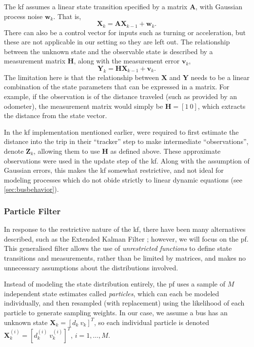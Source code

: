 \documentclass[12pt,a4paper]{article}
\newcommand{\bY}{\mathbf{Y}}
\newcommand{\bX}{\mathbf{X}}
\newcommand{\bZ}{\mathbf{Z}}
\newcommand{\mat}[1]{\mathbf{#1}}
\begin{document}
The \gls{kf} assumes a linear state transition specified by
a matrix $\mat{A}$, with Gaussian process noise $\mat{w}_k$.
That is, 
\begin{equation}
  \label{eq:kf_statetransition}
  \bX_k = \mat{A}\bX_{k-1} + \mat{w}_k.
\end{equation}
There can also be a control vector for inputs such as turning or acceleration,
but these are not applicable in our setting so they are left out.
The relationship between the unknown state and the observable state is described
by a measurement matrix $\mat{H}$, along with the measurement error $\mat{v}_k$,
\begin{equation}
  \label{eq:kf_measurement}
  \bY_k = \mat{H}\bX_{k-1} + \mat{v}_k.
\end{equation}
The limitation here is that the relationship between $\bX$ and $\bY$ needs to be a linear
combination of the state parameters that can be expressed in a matrix.
For example, if the observation is of the distance traveled (such as provided by an odometer), 
the measurement matrix would simply be $\mat{H} = \left[1\ 0\right]$, 
which extracts the distance from the state vector.


In the \gls{kf} implementation mentioned earlier,
\cite{cathey-dailey:2003} were required to first estimate the 
distance into the trip in their ``tracker'' step to make intermediate ``observations'',
denote $\bZ_k$, allowing them to use $\mat{H}$ as defined above.
These approximate observations were used in the update step of the \gls{kf}.
Along with the assumption of Gaussian errors,
this makes the \gls{kf} somewhat restrictive,
and not ideal for modeling processes which do not obide strictly to linear dynamic equations
(see \cref{sec:busbehavior}).



\subsubsection{Particle Filter}
\label{sec:particle_filter}

In response to the restrictive nature of the \gls{kf}, there have been many 
alternatives described, such as the Extended Kalman Filter \citep{cn};
however, we will focus on the \gls{pf}.
This generalised filter allows the use of \emph{unrestricted functions} to define
state transitions and measurements, rather than be limited by matrices,
and makes no unnecessary assumptions about the distributions involved.


Instead of modeling the state distribution entirely, 
the \gls{pf} uses a sample of $M$ independent state estimates called \emph{particles}, 
which can each be modeled individually, and then resampled (with replacement) 
using the likelihood of each particle to generate sampling weights.
In our case, we assume a bus has an unknown state $\bX_k = [d_k\ v_k]^T$,
so each individual particle is denoted $\bX_k^{(i)} = [d_k^{(i)}\ v_k^{(i)}]^T$,
$i = 1, \ldots, M$.
\end{document}
